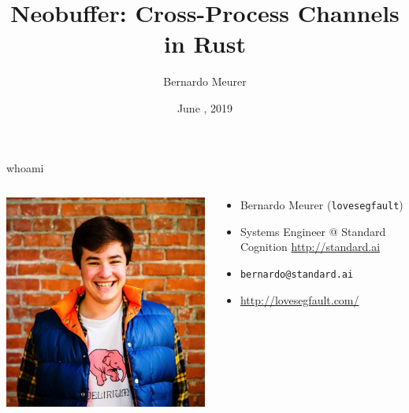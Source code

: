 \documentclass[aspectratio=43]{beamer}
\title{Neobuffer: Cross-Process Channels in Rust}
\author{Bernardo Meurer}
\date{June \nth{28}, 2019}
\institute{Standard Cognition}
\begin{document}
\maketitle

\begin{frame}{whoami}
    \begin{columns}[T]
        \begin{column}{.5\textwidth}
            \includegraphics[width=\textwidth]{./imgs/bernardo-blue.jpg}
        \end{column}
        \begin{column}{.5\textwidth}
            \begin{block}{}
                \begin{itemize}
                    \item Bernardo Meurer (\texttt{\small{lovesegfault}})
                    \item Systems Engineer @ Standard Cognition \url{http://standard.ai}
                    \item \texttt{\small{bernardo@standard.ai}}
                    \item \url{http://lovesegfault.com/}
                \end{itemize}
            \end{block}
        \end{column}
    \end{columns}
\end{frame}
\end{document}
